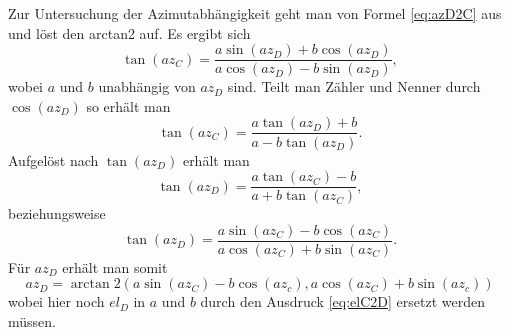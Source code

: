 Zur Untersuchung der Azimutabhängigkeit geht man von Formel \ref{eq:azD2C} aus und löst den arctan2 auf. Es ergibt sich
\begin{equation}
\tan\left(az_C\right)=\frac{a\sin\left(az_D\right)+b\cos\left(az_D\right)}{a\cos\left(az_D\right)-b\sin\left(az_D\right)},
\end{equation}
wobei $a$ und $b$ unabhängig von $az_D$ sind. Teilt man Zähler und Nenner durch $\cos\left(az_D\right)$ so erhält man
\begin{equation}
\tan\left(az_C\right)=\frac{a\tan\left(az_D\right)+b}{a-b\tan\left(az_D\right)}.
\end{equation}
Aufgelöst nach $\tan\left(az_D\right)$ erhält man
\begin{equation}
\tan\left(az_D\right)=\frac{a\tan\left(az_C\right)-b}{a+b\tan\left(az_C\right)},
\end{equation}
beziehungsweise
\begin{equation}
\tan\left(az_D\right)=\frac{a\sin\left(az_C\right)-b\cos\left(az_C\right)}{a\cos\left(az_C\right)+b\sin\left(az_C\right)}.
\end{equation}
Für $az_D$ erhält man somit 
\begin{equation}
az_D=\arctan 2\left(
a\sin\left(az_C\right)-b\cos\left(az_c\right),a\cos\left(az_C\right)+b\sin\left(az_c\right)\right)
\label{eq:azC2D}
\end{equation}
wobei hier noch $el_D$ in $a$ und $b$ durch den Ausdruck \ref{eq:elC2D} ersetzt werden müssen.

